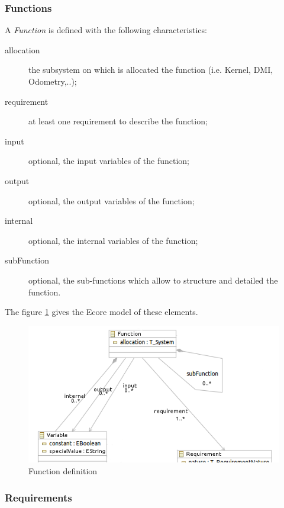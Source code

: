 \subsubsection{Functions}

A \textit{Function} is defined with the following characteristics:
\begin{description}
\item[allocation] the subsystem  on which is allocated the function (i.e. Kernel, DMI, Odometry,..);
\item[requirement] at least one requirement to describe the function;
\item[input] optional, the input variables of the function;
\item[output] optional, the output variables of the function;
\item[internal] optional, the internal variables of the function;
\item[subFunction] optional, the sub-functions which allow to structure and  detailed the function.
\end{description}

The figure \ref{fig:function} gives the Ecore model of these elements.

\begin{figure}[ht]
  \centering
  \includegraphics{DataModel/Function1.png}
  \caption{Function definition}
  \label{fig:function}
\end{figure}

\subsubsection{Requirements}
\label{sec:req}

